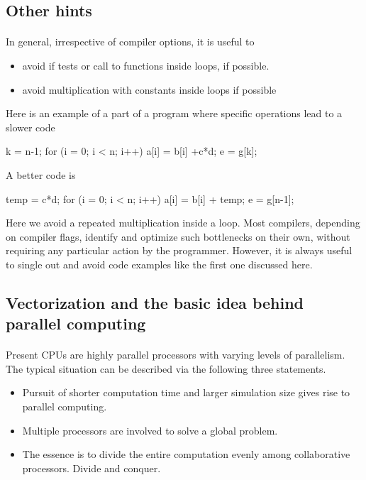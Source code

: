 \documentclass[%
oneside,                 %
final,                   %
10pt]{article}
\begin{document}
\subsection{Other hints}

\paragraph{}
In general, irrespective of compiler options, it is useful to
\begin{itemize}
\item avoid if tests or call to functions inside loops, if possible. 

\item avoid multiplication with constants inside loops if possible
\end{itemize}

\noindent
Here is an example of a part of a program where specific operations lead to a slower code






\bcppcod
k = n-1;
for (i = 0; i < n; i++){
    a[i] = b[i] +c*d;
    e = g[k];
}

\ecppcod

A better code is






\bcppcod
temp = c*d;
for (i = 0; i < n; i++){
    a[i] = b[i] + temp;
}
e = g[n-1];

\ecppcod

Here we avoid a repeated multiplication inside a loop. 
Most compilers, depending on compiler flags, identify and optimize such bottlenecks on their own, without requiring any particular action by the programmer. However, it is always useful to single out and avoid code examples like the first one discussed here.



\subsection{Vectorization and the basic idea behind parallel computing}

\paragraph{}
Present CPUs are highly parallel processors with varying levels of parallelism. The typical situation can be described via the following three statements.
\begin{itemize}
\item Pursuit of shorter computation time and larger simulation size gives rise to parallel computing.

\item Multiple processors are involved to solve a global problem.

\item The essence is to divide the entire computation evenly among collaborative processors.  Divide and conquer.
\end{itemize}
\end{document}

